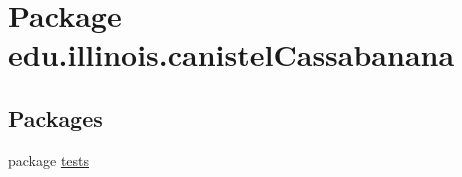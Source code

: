 \hypertarget{namespaceedu_1_1illinois_1_1canistelCassabanana}{
\section{Package edu.illinois.canistelCassabanana}
\label{namespaceedu_1_1illinois_1_1canistelCassabanana}
}
\subsection*{Packages}
\begin{DoxyCompactItemize}
\item 
package \hyperlink{namespaceedu_1_1illinois_1_1canistelCassabanana_1_1tests}{tests}
\end{DoxyCompactItemize}
